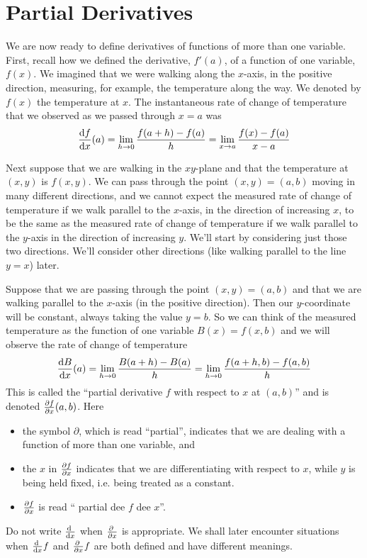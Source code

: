 \section{Partial Derivatives}\label{sec partials}
We are now ready to define derivatives of functions of more than one variable.
First, recall how we defined the derivative, $f'(a)$, of a function
of one variable, $f(x)$. We imagined that we were walking along the $x$-axis,
in the positive direction, measuring, for example, the temperature
along the way. We denoted by $f(x)$ the temperature at $x$. The instantaneous rate of change of temperature that we observed as we passed through $x=a$ was
\begin{equation*}
\diff{f}{x}(a) =\lim_{h\rightarrow 0}\frac{f(a+h) - f(a)}{h}
      =\lim_{x\rightarrow a}\frac{f(x) - f(a)}{x-a}
\end{equation*}

Next suppose that we are walking in the $xy$-plane and that the temperature
at $(x,y)$ is $f(x,y)$. We can pass through the point $(x,y)=(a,b)$ moving
in many different directions, and we cannot expect the measured rate of
change of temperature if we walk parallel to the $x$-axis, in the
direction of increasing $x$, to be the same as the measured rate of change of temperature if we walk parallel to the $y$-axis in the direction of increasing $y$. We'll start by considering just those two directions. We'll consider
other directions (like walking parallel to the line $y=x$) later.

Suppose that we are passing through the point $(x,y)=(a,b)$ and that 
we are walking parallel to the $x$-axis (in the positive direction). 
Then our $y$-coordinate will be constant, always taking the value $y=b$. 
So we can think of the measured temperature as the function of one 
variable $B(x) = f(x,b)$ and we will observe the rate of change of temperature 
\begin{equation*}
\diff{B}{x}(a) = \lim_{h\rightarrow 0}\frac{B(a+h) - B(a)}{h}
      = \lim_{h\rightarrow 0}\frac{f(a+h,b) - f(a,b)}{h}
\end{equation*}
This is called the ``partial derivative $f$ with respect to $x$ at $(a,b)$''
and is denoted $\pdiff{f}{x}(a,b)$. Here
\begin{itemize}\itemsep1pt \parskip0pt 
\item[$\circ$] 
the symbol $\partial$, which is read ``partial'', indicates that 
we are dealing with a function of more than one variable, and 
\item[$\circ$] 
the $x$ in ${\pdiff{f}{x}}$ indicates that we are differentiating 
with respect to $x$, while $y$ is being held fixed, i.e. being treated as a constant.
\item[$\circ$] 
${\pdiff{f}{x}}$ is read `` partial dee $f$ dee $x$''.
\end{itemize}
Do not write $\diff{}{x}$ when $\pdiff{}{x}$ is appropriate.
We shall later encounter situations when $\diff{}{x}f$ and
$\pdiff{}{x}f$ are both defined and have different meanings.


